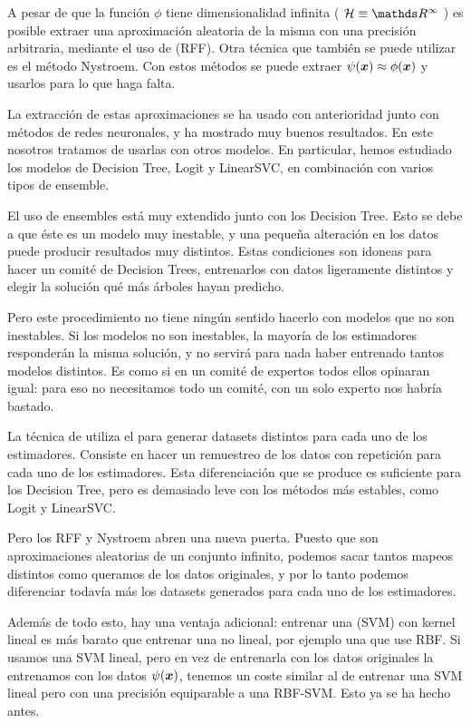   A pesar de que la función $\phi$ tiene dimensionalidad infinita (
  $\mathcal{H} \equiv \reals^\infty$
  ) es posible extraer una aproximación aleatoria de la misma con una precisión arbitraria,
  mediante el uso de  \cite{rff} (RFF). Otra técnica
  que también se puede utilizar es el método Nystroem. Con estos
  métodos se puede extraer $\psi(\bm{x}) \approx \phi(\bm{x})$ y usarlos para lo que
  haga falta.

  La extracción de estas aproximaciones se ha usado con anterioridad junto con
  métodos de redes neuronales, y ha mostrado muy buenos resultados. En este
  nosotros tratamos de usarlas con otros modelos. En particular, hemos
  estudiado los modelos de Decision Tree, Logit y LinearSVC, en combinación con
  varios tipos de ensemble.

  El uso de ensembles está muy extendido junto con los Decision Tree. Esto se
  debe a que éste es un modelo muy inestable, y una pequeña alteración en los
  datos puede producir resultados muy distintos. Estas condiciones son idoneas
  para hacer un comité de Decision Trees, entrenarlos con datos ligeramente
  distintos y elegir la solución qué más árboles hayan predicho.

  Pero este procedimiento no tiene ningún sentido hacerlo con modelos que no son
  inestables. Si los modelos no son inestables, la mayoría de los estimadores
  responderán la misma solución, y no servirá para nada haber entrenado tantos
  modelos distintos. Es como si en un comité de expertos todos ellos opinaran
  igual: para eso no necesitamos todo un comité, con un solo experto nos habría
  bastado.

  La técnica de  utiliza el  para generar datasets
  distintos para cada uno de los estimadores. Consiste en hacer un remuestreo de
  los datos con repetición para cada uno de los estimadores. Esta diferenciación
  que se produce es suficiente para los Decision Tree, pero es demasiado leve con
  los métodos más estables, como Logit y LinearSVC.

  Pero los RFF y Nystroem abren una nueva puerta. Puesto que son aproximaciones
  aleatorias de un conjunto infinito, podemos sacar tantos mapeos distintos
  como queramos de los datos originales, y por lo tanto podemos diferenciar
  todavía más los datasets generados para cada uno de los estimadores.

  Además de todo esto, hay una ventaja adicional: entrenar una  (SVM) con kernel lineal es más barato que entrenar una no lineal, por
  ejemplo una que use RBF. Si usamos una SVM lineal, pero en vez de entrenarla
  con los datos originales la entrenamos con los datos $\psi(\bm{x})$, tenemos un
  coste similar al de entrenar una SVM lineal pero con una precisión equiparable
  a una RBF-SVM. Esto ya se ha hecho antes.

